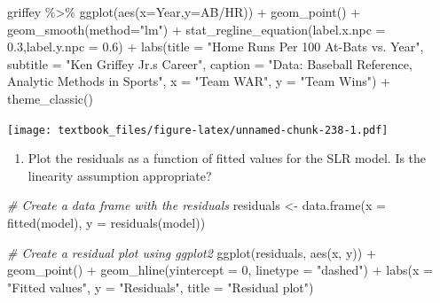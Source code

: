 \documentclass[
  11pt,
]{book}
\newenvironment{Shaded}{\begin{snugshade}}{\end{snugshade}}
\newcommand{\AttributeTok}[1]{\textcolor[rgb]{0.77,0.63,0.00}{#1}}
\newcommand{\CommentTok}[1]{\textcolor[rgb]{0.56,0.35,0.01}{\textit{#1}}}
\newcommand{\DecValTok}[1]{\textcolor[rgb]{0.00,0.00,0.81}{#1}}
\newcommand{\FloatTok}[1]{\textcolor[rgb]{0.00,0.00,0.81}{#1}}
\newcommand{\FunctionTok}[1]{\textcolor[rgb]{0.00,0.00,0.00}{#1}}
\newcommand{\NormalTok}[1]{#1}
\newcommand{\OtherTok}[1]{\textcolor[rgb]{0.56,0.35,0.01}{#1}}
\newcommand{\SpecialCharTok}[1]{\textcolor[rgb]{0.00,0.00,0.00}{#1}}
\newcommand{\StringTok}[1]{\textcolor[rgb]{0.31,0.60,0.02}{#1}}
\providecommand{\tightlist}{%
  \setlength{\itemsep}{0pt}\setlength{\parskip}{0pt}}
\theoremstyle{definition}
\theoremstyle{definition}
\theoremstyle{definition}
\theoremstyle{definition}
\theoremstyle{remark}
\begin{document}
\begin{Shaded}
\begin{Highlighting}[]
\NormalTok{griffey }\SpecialCharTok{\%\textgreater{}\%} \FunctionTok{ggplot}\NormalTok{(}\FunctionTok{aes}\NormalTok{(}\AttributeTok{x=}\NormalTok{Year,}\AttributeTok{y=}\StringTok{\textasciigrave{}}\AttributeTok{AB/HR}\StringTok{\textasciigrave{}}\NormalTok{)) }\SpecialCharTok{+}
  \FunctionTok{geom\_point}\NormalTok{() }\SpecialCharTok{+}
  \FunctionTok{geom\_smooth}\NormalTok{(}\AttributeTok{method=}\StringTok{"lm"}\NormalTok{) }\SpecialCharTok{+} 
  \FunctionTok{stat\_regline\_equation}\NormalTok{(}\AttributeTok{label.x.npc =} \FloatTok{0.3}\NormalTok{,}\AttributeTok{label.y.npc =} \FloatTok{0.6}\NormalTok{) }\SpecialCharTok{+}
  \FunctionTok{labs}\NormalTok{(}\AttributeTok{title =} \StringTok{"Home Runs Per 100 At{-}Bats vs. Year"}\NormalTok{,}
       \AttributeTok{subtitle =} \StringTok{"Ken Griffey Jr.\textquotesingle{}s Career"}\NormalTok{,}
       \AttributeTok{caption =} \StringTok{"Data: Baseball Reference, Analytic Methods in Sports"}\NormalTok{, }
       \AttributeTok{x =} \StringTok{"Team WAR"}\NormalTok{,}
       \AttributeTok{y =} \StringTok{"Team Wins"}\NormalTok{) }\SpecialCharTok{+}
  \FunctionTok{theme\_classic}\NormalTok{()}
\end{Highlighting}
\end{Shaded}

\texttt{[image: textbook\_files/figure-latex/unnamed-chunk-238-1.pdf]}

\newpage

\begin{enumerate}
\def\labelenumi{(\alph{enumi})}
\setcounter{enumi}{3}
\tightlist
\item
  Plot the residuals as a function of fitted values for the SLR model. Is the linearity assumption appropriate?
\end{enumerate}

\begin{Shaded}
\begin{Highlighting}[]
\CommentTok{\# Create a data frame with the residuals}
\NormalTok{residuals }\OtherTok{\textless{}{-}} \FunctionTok{data.frame}\NormalTok{(}\AttributeTok{x =} \FunctionTok{fitted}\NormalTok{(model), }\AttributeTok{y =} \FunctionTok{residuals}\NormalTok{(model))}

\CommentTok{\# Create a residual plot using ggplot2}
\FunctionTok{ggplot}\NormalTok{(residuals, }\FunctionTok{aes}\NormalTok{(x, y)) }\SpecialCharTok{+}
  \FunctionTok{geom\_point}\NormalTok{() }\SpecialCharTok{+}
  \FunctionTok{geom\_hline}\NormalTok{(}\AttributeTok{yintercept =} \DecValTok{0}\NormalTok{, }\AttributeTok{linetype =} \StringTok{"dashed"}\NormalTok{) }\SpecialCharTok{+}
  \FunctionTok{labs}\NormalTok{(}\AttributeTok{x =} \StringTok{"Fitted values"}\NormalTok{, }\AttributeTok{y =} \StringTok{"Residuals"}\NormalTok{, }\AttributeTok{title =} \StringTok{"Residual plot"}\NormalTok{)}
\end{Highlighting}
\end{Shaded}
\end{document}
